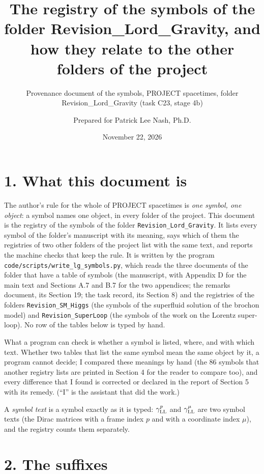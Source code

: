 \documentclass[
  10pt,
]{article}
\title{The registry of the symbols of the folder
Revision\_Lord\_Gravity, and how they relate to the other folders of the
project}
\subtitle{Provenance document of the symbols, PROJECT spacetimes, folder
Revision\_Lord\_Gravity (task C23, stage 4b)}
\author{Prepared for Patrick Lee Nash, Ph.D.}
\date{November 22, 2026}
\begin{document}
\maketitle

\hypertarget{what-this-document-is}{%
\section{1. What this document is}\label{what-this-document-is}}

The author's rule for the whole of PROJECT spacetimes is \emph{one
symbol, one object}: a symbol names one object, in every folder of the
project. This document is the registry of the symbols of the folder
\texttt{Revision\_Lord\_Gravity}. It lists every symbol of the folder's
manuscript with its meaning, says which of them the registries of two
other folders of the project list with the same text, and reports the
machine checks that keep the rule. It is written by the program
\texttt{code/scripts/write\_lg\_symbols.py}, which reads the three
documents of the folder that have a table of symbols (the manuscript,
with Appendix D for the main text and Sections A.7 and B.7 for the two
appendices; the remarks document, its Section 19; the task record, its
Section 8) and the registries of the folders
\texttt{Revision\_SM\_Higgs} (the symbols of the superfluid solution of
the brochon model) and \texttt{Revision\_SuperLoop} (the symbols of the
work on the Lorentz super-loop). No row of the tables below is typed by
hand.

What a program can check is whether a symbol is listed, where, and with
which text. Whether two tables that list the same symbol mean the same
object by it, a program cannot decide; I compared these meanings by hand
(the 86 symbols that another registry lists are printed in Section 4 for
the reader to compare too), and every difference that I found is
corrected or declared in the report of Section 5 with its remedy. (``I''
is the assistant that did the work.)

A \emph{symbol text} is a symbol exactly as it is typed:
\(\gamma^p_{\rm LL}\) and \(\gamma^\mu_{\rm LL}\) are two symbol texts
(the Dirac matrices with a frame index \(p\) and with a coordinate index
\(\mu\)), and the registry counts them separately.

\hypertarget{the-suffixes}{%
\section{2. The suffixes}\label{the-suffixes}}
\end{document}
